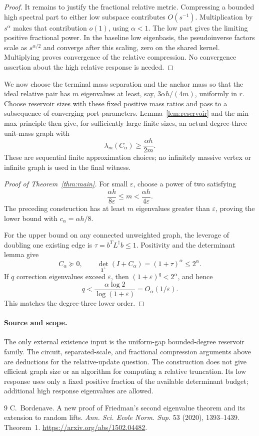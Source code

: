 \documentclass[11pt]{article}
\begin{document}
\begin{proof}
It remains to justify the fractional relative metric. Compressing a
bounded high spectral part to either low subspace contributes
$O(s^{-1})$. Multiplication by $s^\alpha$ makes that contribution
$o(1)$, using $\alpha<1$. The low part gives the limiting positive
fractional power. In the baseline low eigenbasis, the pseudoinverse
factors scale as $s^{\alpha/2}$ and converge after this scaling, zero
on the shared kernel. Multiplying proves convergence of the relative
compression. No convergence assertion about the high relative
response is needed.
\end{proof}

We now choose the terminal mass separation and the anchor mass so
that the ideal relative pair has $m$ eigenvalues at least, say,
$3\alpha h/(4m)$, uniformly in $r$. Choose reservoir sizes with these
fixed positive mass ratios and pass to a subsequence of converging
port parameters. Lemma~\ref{lem:reservoir} and the min--max principle
then give, for sufficiently large finite sizes, an actual degree-three
unit-mass graph with
\[
 \lambda_m(C_\alpha)\ge\frac{\alpha h}{2m}.
\]
These are sequential finite approximation choices; no infinitely
massive vertex or infinite graph is used in the final witness.

\begin{proof}[Proof of Theorem~\ref{thm:main}]
For small $\varepsilon$, choose a power of two satisfying
\[
 \frac{\alpha h}{8\varepsilon}\le m
                  <\frac{\alpha h}{4\varepsilon}.
\]
The preceding construction has at least $m$ eigenvalues greater than
$\varepsilon$, proving the lower bound with $c_\alpha=\alpha h/8$.

For the upper bound on any connected unweighted graph, the leverage
of doubling one existing edge is $\tau=b^TL^\dagger b\le1$.
Positivity and the determinant lemma give
\[
 C_\alpha\succeq0,\qquad
 \det_{\mathbf1^\perp}(I+C_\alpha)=(1+\tau)^\alpha\le2^\alpha.
\]
If $q$ correction eigenvalues exceed $\varepsilon$, then
$(1+\varepsilon)^q<2^\alpha$, and hence
\[
 q<\frac{\alpha\log2}{\log(1+\varepsilon)}
                        =O_\alpha(1/\varepsilon).
\]
This matches the degree-three lower order.
\end{proof}

\paragraph{Source and scope.}
The only external existence input is the uniform-gap bounded-degree
reservoir family. The circuit, separated-scale, and fractional
compression arguments above are deductions for the relative-update
question. The construction does not give efficient graph size or an
algorithm for computing a relative truncation. Its low response uses
only a fixed positive fraction of the available determinant budget;
additional high response eigenvalues are allowed.

\begin{thebibliography}{9}
 C.~Bordenave. A new proof of Friedman's second
eigenvalue theorem and its extension to random lifts.
\textit{Ann. Sci. Ecole Norm. Sup.} 53 (2020), 1393--1439. Theorem~1.
\url{https://arxiv.org/abs/1502.04482}.
\end{thebibliography}
\end{document}
